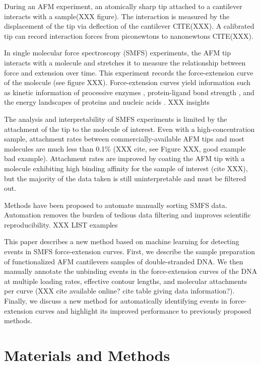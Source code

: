 \documentclass[%
  aip,12pt,tightenlines,
  amsthm,
 amsmath,amssymb
]{article}
\newcommand{\sLabel}[1]{\label{section:#1}}
\newcommand{\pl}[0]{\vspace{6pt}}
\newcommand{\singlemol}[0]{SMFS}
\newcommand{\citePRH}[1]{\cite{#1}}
\begin{document}
During an AFM experiment, an atomically sharp tip attached to a cantilever interacts with a sample(XXX figure). The interaction is measured by the displacement of the tip via deflection of the cantilever CITE(XXX). A calibrated tip can record interaction forces from piconewtons to nanonewtons CITE(XXX). \pl

In single molecular force spectroscopy (\singlemol{}) experiments, the AFM tip interacts with a molecule and stretches it to measure the relationship between force and extension over time. This experiment records the force-extension curve of the molecule (see figure XXX). Force-extension curves yield information such as kinetic information of processive enzymes \citePRH{comstock_direct_2015}, protein-ligand bond strength \citePRH{yuan_energy_2000}, and the energy landscapes of proteins and nucleic acids \citePRH{dudko_Theory_2008}. XXX insights \pl

The analysis and interpretability of \singlemol{} experiments is limited by the attachment of the tip to the molecule of interest. Even with a high-concentration sample, attachment rates between commercially-available AFM tips and most molecules are much less than 0.1\% (XXX cite, see Figure XXX, good example bad example). Attachment rates are improved by coating the AFM tip with a molecule exhibiting high binding affinity for the sample of interest (cite XXX), but the majority of the data taken is still uninterpretable and must be filtered out.\pl

Methods have been proposed to automate manually sorting \singlemol{} data. Automation removes the burden of tedious data filtering and improves scientific reproducibility. XXX LIST examples \pl

This paper describes a new method based on machine learning for detecting events in SMFS force-extension curves.  First, we describe the sample preparation of functionalized AFM cantilevers samples of double-stranded DNA. We then manually annotate the unbinding events in the force-extension curves of the DNA at multiple loading rates, effective contour lengths, and molecular attachments per curve (XXX cite available online? cite table giving data information?). Finally, we discuss a new method for automatically identifying events in force-extension curves and highlight its improved performance to previously proposed methods. \pl


\section{\sLabel{Materials}Materials and Methods}
\end{document}

